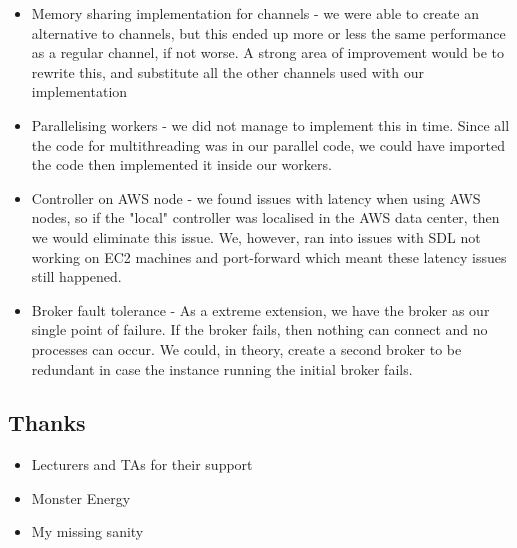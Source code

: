 \documentclass[twoside,twocolumn]{article}
\begin{document}
\begin{itemize}
  \item Memory sharing implementation for channels - we were able to create an alternative to channels, but
  this ended up more or less the same performance as a regular channel, if not worse. A strong area of improvement
  would be to rewrite this, and substitute all the other channels used with our implementation
  \item Parallelising workers - we did not manage to implement this in time. Since all the code for multithreading
  was in our parallel code, we could have imported the code then implemented it inside our workers.
  \item Controller on AWS node - we found issues with latency when using AWS nodes, so if the "local" controller was
  localised in the AWS data center, then we would eliminate this issue. We, however, ran into issues with SDL not working
  on EC2 machines and port-forward which meant these latency issues still happened.
  \item Broker fault tolerance - As a extreme extension, we have the broker as our single point of failure. If the broker fails, then
  nothing can connect and no processes can occur. We could, in theory, create a second broker to be redundant in case the instance 
  running the initial broker fails.
\end{itemize}
\subsection{Thanks}
\begin{itemize}
  \item Lecturers and TAs for their support
  \item Monster Energy\texttrademark
  \item My missing sanity
\end{itemize}



\end{document}
